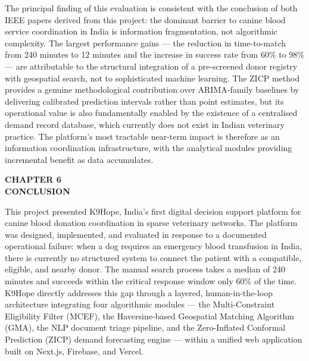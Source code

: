 \documentclass[12pt,a4paper]{article}
\begin{document}
\noindent The principal finding of this evaluation is consistent with the conclusion of both IEEE papers derived from this project: the dominant barrier to canine blood service coordination in India is information fragmentation, not algorithmic complexity. The largest performance gains — the reduction in time-to-match from 240 minutes to 12 minutes and the increase in success rate from 60\% to 98\% — are attributable to the structural integration of a pre-screened donor registry with geospatial search, not to sophisticated machine learning. The ZICP method provides a genuine methodological contribution over ARIMA-family baselines by delivering calibrated prediction intervals rather than point estimates, but its operational value is also fundamentally enabled by the existence of a centralised demand record database, which currently does not exist in Indian veterinary practice. The platform's most tractable near-term impact is therefore as an information coordination infrastructure, with the analytical modules providing incremental benefit as data accumulates.

\newpage
\begin{center}
    \textbf{\large CHAPTER 6}\\[0.4em]
    \textbf{\large CONCLUSION}
\end{center}
\vspace{1.5em}

\noindent This project presented K9Hope, India's first digital decision support platform for canine blood donation coordination in sparse veterinary networks. The platform was designed, implemented, and evaluated in response to a documented operational failure: when a dog requires an emergency blood transfusion in India, there is currently no structured system to connect the patient with a compatible, eligible, and nearby donor. The manual search process takes a median of 240 minutes and succeeds within the critical response window only 60\% of the time. K9Hope directly addresses this gap through a layered, human-in-the-loop architecture integrating four algorithmic modules — the Multi-Constraint Eligibility Filter (MCEF), the Haversine-based Geospatial Matching Algorithm (GMA), the NLP document triage pipeline, and the Zero-Inflated Conformal Prediction (ZICP) demand forecasting engine — within a unified web application built on Next.js, Firebase, and Vercel.
\end{document}
